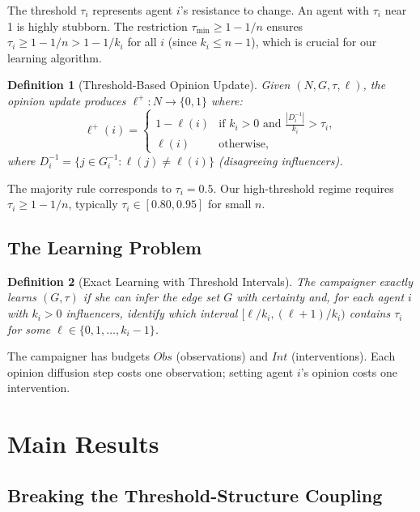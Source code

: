 \documentclass[conference]{IEEEtran}
\newtheorem{definition}{Definition}
\begin{document}
The threshold $\tau_i$ represents agent $i$'s resistance to change. An agent with $\tau_i$ near 1 is highly stubborn. The restriction $\tau_{\min} \geq 1 - 1/n$ ensures $\tau_i \geq 1 - 1/n > 1 - 1/k_i$ for all $i$ (since $k_i \leq n-1$), which is crucial for our learning algorithm.

\begin{definition}[Threshold-Based Opinion Update]
\label{def:threshold_update}
Given $(N, G, \tau, \ell)$, the opinion update produces $\ell^+ : N \to \{0, 1\}$ where:
\[
\ell^+(i) = \begin{cases}
1 - \ell(i) & \text{if } k_i > 0 \text{ and } \frac{|D^{-1}_i|}{k_i} > \tau_i, \\
\ell(i) & \text{otherwise},
\end{cases}
\]
where $D^{-1}_i = \{j \in G^{-1}_i : \ell(j) \neq \ell(i)\}$ (disagreeing influencers).
\end{definition}

The majority rule corresponds to $\tau_i = 0.5$. Our high-threshold regime requires $\tau_i \geq 1 - 1/n$, typically $\tau_i \in [0.80, 0.95]$ for small $n$.

\subsection{The Learning Problem}

\begin{definition}[Exact Learning with Threshold Intervals]
\label{def:exact_learning_threshold}
The campaigner \emph{exactly learns} $(G, \tau)$ if she can infer the edge set $G$ with certainty and, for each agent $i$ with $k_i > 0$ influencers, identify which interval $[\ell/k_i, (\ell+1)/k_i)$ contains $\tau_i$ for some $\ell \in \{0, 1, \ldots, k_i-1\}$.
\end{definition}

The campaigner has budgets $Obs$ (observations) and $Int$ (interventions). Each opinion diffusion step costs one observation; setting agent $i$'s opinion costs one intervention.

\section{Main Results}
\label{sec:results}

\subsection{Breaking the Threshold-Structure Coupling}
\end{document}
